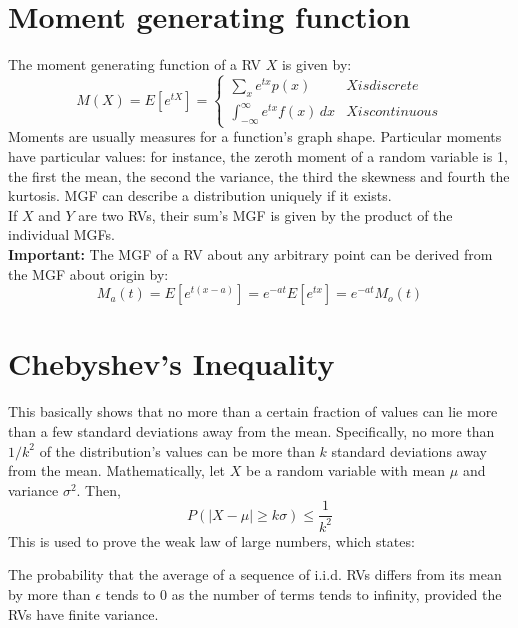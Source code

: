 \documentclass{article}
\begin{document}
\section{Moment generating function}
The moment generating function of a RV $ X $ is given by: 
\begin{equation*}
M(X) = E[e^{tX}] = \begin{cases}
        \sum_{x}^{}e^{tx}p(x) & X is discrete \\
        \int_{-\infty}^{\infty} e^{tx}f(x)\,dx & X is continuous
    \end{cases}
\end{equation*}
Moments are usually measures for a function's graph shape. Particular moments have particular values: for instance,
the zeroth moment of a random variable is 1, the first the mean, the second the variance, the third the skewness and fourth the kurtosis.
MGF can describe a distribution uniquely if it exists. \\
If $X$ and $Y$ are two RVs, their sum's MGF is given by the product of the individual MGFs. \\
\textbf{Important:} The MGF of a RV about any arbitrary point can be derived from the MGF about origin by:
\begin{equation*}
M_{a}(t) = E[e^{t(x-a)}] = e^{-at}E[e^{tx}] = e^{-at}M_{o}(t)
\end{equation*}

\section{Chebyshev's Inequality}
This basically shows that no more than a certain fraction of values can lie more than a few standard deviations away from the mean.
Specifically, no more than $ 1/k^{2} $  of the distribution's values can be more than $ k $ standard deviations away from the mean.
Mathematically, let $ X $ be a random variable with mean $ \mu $ and variance $ \sigma^{2} $. Then,
\begin{equation*}
P(|X - \mu| \geq k\sigma) \leq \frac{1}{k^{2}}
\end{equation*}
This is used to prove the weak law of large numbers, which states:
\begin{theorem} The probability that the average of a sequence of i.i.d. RVs differs from its mean by more than $ \epsilon $ tends to 0 as 
  the number of terms tends to infinity, provided the RVs have finite variance.
\end{theorem}
\end{document}
